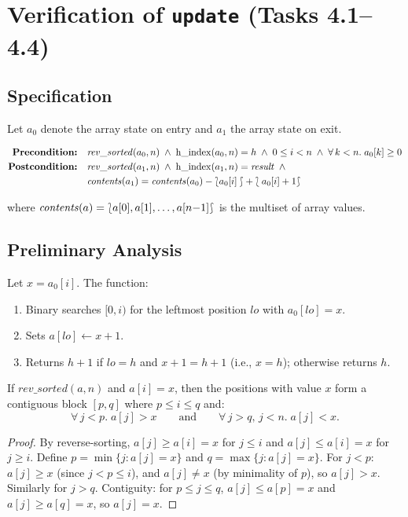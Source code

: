 \section{Verification of \texttt{update} (Tasks 4.1--4.4)}
\label{sec:update}

\subsection{Specification}

Let $a_0$ denote the array state on entry and $a_1$ the array state on exit.

\begin{align*}
  \textbf{Precondition:}\quad &
    \mathit{rev\_sorted}(a_0, n) \;\wedge\;
    \operatorname{h\_index}(a_0, n) = h \;\wedge\;
    0 \leq i < n \;\wedge\;
    \forall\, k < n.\; a_0[k] \geq 0 \\
  \textbf{Postcondition:}\quad &
    \mathit{rev\_sorted}(a_1, n) \;\wedge\;
    \operatorname{h\_index}(a_1, n) = \mathit{result} \;\wedge\; {} \\
    & \mathit{contents}(a_1) = \mathit{contents}(a_0) - \lbag a_0[i] \rbag + \lbag a_0[i] + 1 \rbag
\end{align*}

where $\mathit{contents}(a) = \lbag a[0], a[1], \ldots, a[n{-}1] \rbag$ is the multiset of array values.

\subsection{Preliminary Analysis}

Let $x = a_0[i]$. The function:
\begin{enumerate}
  \item Binary searches $[0, i)$ for the leftmost position $\mathit{lo}$ with $a_0[\mathit{lo}] = x$.
  \item Sets $a[\mathit{lo}] \gets x + 1$.
  \item Returns $h+1$ if $\mathit{lo} = h$ and $x + 1 = h + 1$ (i.e., $x = h$); otherwise returns $h$.
\end{enumerate}

\begin{lemma}\label{lem:equal-block}
If $\mathit{rev\_sorted}(a, n)$ and $a[i] = x$, then the positions with value $x$ form
a contiguous block $[p, q]$ where $p \leq i \leq q$ and:
\[
  \forall\, j < p.\; a[j] > x \qquad\text{and}\qquad
  \forall\, j > q,\, j < n.\; a[j] < x.
\]
\end{lemma}
\begin{proof}
By reverse-sorting, $a[j] \geq a[i] = x$ for $j \leq i$ and $a[j] \leq a[i] = x$ for $j \geq i$.
Define $p = \min\{j : a[j] = x\}$ and $q = \max\{j : a[j] = x\}$.
For $j < p$: $a[j] \geq x$ (since $j < p \leq i$), and $a[j] \neq x$ (by minimality of $p$),
so $a[j] > x$. Similarly for $j > q$.
Contiguity: for $p \leq j \leq q$, $a[j] \leq a[p] = x$ and $a[j] \geq a[q] = x$, so $a[j] = x$.
\end{proof}

